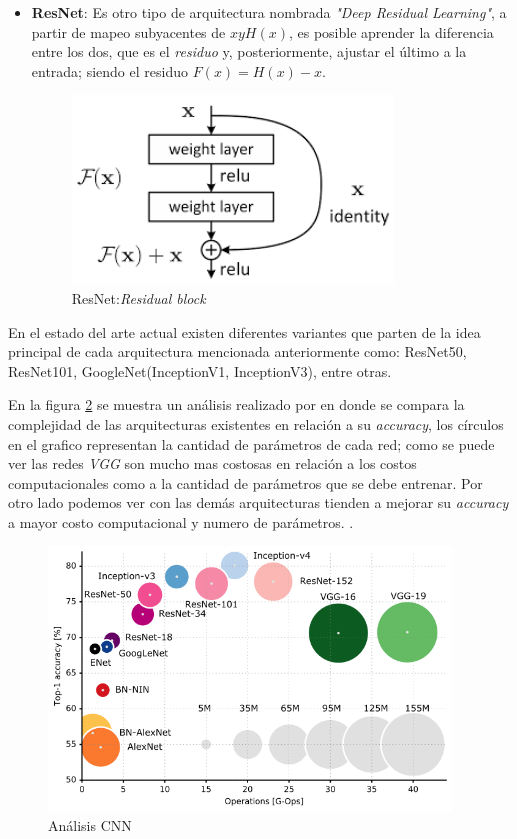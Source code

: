 \begin{itemize}
\item \textbf{ResNet}: Es otro tipo de arquitectura nombrada \textit{"Deep Residual Learning"}, a partir de mapeo subyacentes de $x y H (x)$, es posible aprender la diferencia entre los dos, que es el \textit{residuo} y, posteriormente, ajustar el último a la entrada; siendo el residuo $F(x) = H(x) - x$.

\begin{figure}[H]
 \centering
  \includegraphics[height=5cm,keepaspectratio=true,clip=true]{imagenes/MarcoTeorico/resnet.png}
  \caption{ResNet:\textit{Residual block}}
	\label{Fig:inception}
\end{figure}

\end{itemize}

En el estado del arte actual existen diferentes variantes que parten de la idea principal de cada arquitectura mencionada anteriormente como: ResNet50, ResNet101, GoogleNet(InceptionV1, InceptionV3), entre otras. 

En la  figura \ref{Fig:cnn-analisis} se muestra un análisis realizado por \cite{Analysis_deep_network} en donde se compara la complejidad de las arquitecturas existentes en relación a su \textit{accuracy}, los círculos en el grafico representan la cantidad de parámetros de cada red; como se puede ver las redes \textit{VGG} son mucho mas costosas en relación a los costos computacionales como a la cantidad de parámetros que se debe entrenar. Por otro lado podemos ver con las demás arquitecturas tienden a mejorar su \textit{accuracy} a mayor costo computacional y numero de parámetros.
.

\begin{figure}[H]
 \centering
  \includegraphics[height=7cm,keepaspectratio=true,clip=true]{imagenes/MarcoTeorico/cnn-analisis.png}
  \caption{Análisis CNN}
	\label{Fig:cnn-analisis}
\end{figure}



